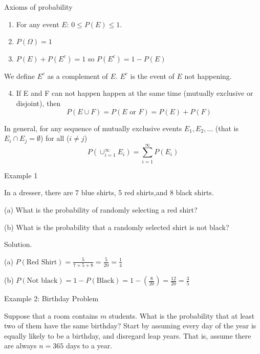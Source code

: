 \documentclass[
  ignorenonframetext,
]{beamer}
\providecommand{\tightlist}{%
  \setlength{\itemsep}{0pt}\setlength{\parskip}{0pt}}
\begin{document}
\begin{frame}{Axioms of probability}
\label{axioms-of-probability}
\begin{enumerate}
\item
  For any event \(E\): \(0\leq P(E) \leq 1.\)
\item
  \(P(\Omega)=1\)
\item
  \(P(E)+P(E^{c})=1\) so \(P(E^c)=1-P(E)\)
\end{enumerate}

We define \(E^{c}\) as a complement of \(E\). \(E^{c}\) is the event of
\(E\) not happening.

\begin{enumerate}
\setcounter{enumi}{3}
\tightlist
\item
  If E and F can not happen happen at the same time (mutually exclusive
  or disjoint), then \[P(E \cup F)=P(E \text{ or } F)=P(E) + P(F)\]
\end{enumerate}

In general, for any sequence of mutually exclusive events
\(E_1, E_2, \ldots\) (that is \(E_i \cap E_j = \emptyset\)) for all
(\(i\neq j\))
\[P\left(\cup_{i=1}^{\infty} E_i\right)=\sum_{i=1}^{\infty} P(E_i)\]
\end{frame}

\begin{frame}{Example 1}
\label{example-1}
\begin{tcolorbox}

In a dresser, there are 7 blue shirts, 5 red shirts,and 8 black shirts.

(a) What is the probability of randomly selecting a red shirt?

(b) What is the probability that a randomly selected shirt is not black?

\end{tcolorbox}

\pause

\begin{tcolorbox}
Solution.

(a) $P(\text{Red Shirt})=\frac{5}{7+5+8}=\frac{5}{20}=\frac{1}{4}$

(b) $P( \text{Not black})=1 - P(\text{Black})=1 - \left(\frac{8}{20}\right)=\frac{12}{20}=\frac{3}{5}$

\end{tcolorbox}
\end{frame}

\begin{frame}{Example 2: Birthday Problem}
\label{example-2-birthday-problem}
\begin{tcolorbox}

Suppose that a room contains $m$ students. What is the probability that at least two of them have the same birthday? Start by assuming every day of the year is equally likely to be a birthday, and disregard leap years. That is, assume there are always $n=365$ days to a year.

\end{tcolorbox}
\end{frame}
\end{document}
